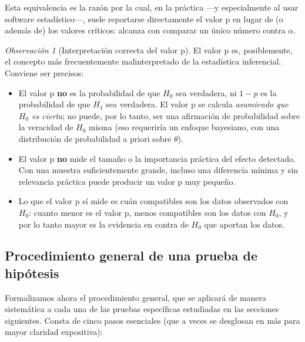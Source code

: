 \documentclass[11pt,a4paper]{article}
\theoremstyle{plain}
\theoremstyle{definition}
\theoremstyle{remark}
\newtheorem{observacion}[teorema]{Observación}
\begin{document}
Esta equivalencia es la razón por la cual, en la práctica —y especialmente al usar software estadístico—, suele reportarse directamente el valor p en lugar de (o además de) los valores críticos: alcanza con comparar un único número contra $\alpha$.

\begin{observacion}[Interpretación correcta del valor p]
El valor p es, posiblemente, el concepto más frecuentemente malinterpretado de la estadística inferencial. Conviene ser precisos:
\begin{itemize}[nosep]
\item El valor p \textbf{no} es la probabilidad de que $H_0$ sea verdadera, ni $1-p$ es la probabilidad de que $H_1$ sea verdadera. El valor p se calcula \emph{asumiendo que $H_0$ es cierta}; no puede, por lo tanto, ser una afirmación de probabilidad sobre la veracidad de $H_0$ misma (eso requeriría un enfoque bayesiano, con una distribución de probabilidad a priori sobre $\theta$).
\item El valor p \textbf{no} mide el tamaño o la importancia práctica del efecto detectado. Con una muestra suficientemente grande, incluso una diferencia mínima y sin relevancia práctica puede producir un valor p muy pequeño.
\item Lo que el valor p sí mide es cuán compatibles son los datos observados con $H_0$: cuanto menor es el valor p, menos compatibles son los datos con $H_0$, y por lo tanto mayor es la evidencia en contra de $H_0$ que aportan los datos.
\end{itemize}
\end{observacion}

\subsection{Procedimiento general de una prueba de hipótesis}

Formalizamos ahora el procedimiento general, que se aplicará de manera sistemática a cada una de las pruebas específicas estudiadas en las secciones siguientes. Consta de cinco pasos esenciales (que a veces se desglosan en más para mayor claridad expositiva):
\end{document}
